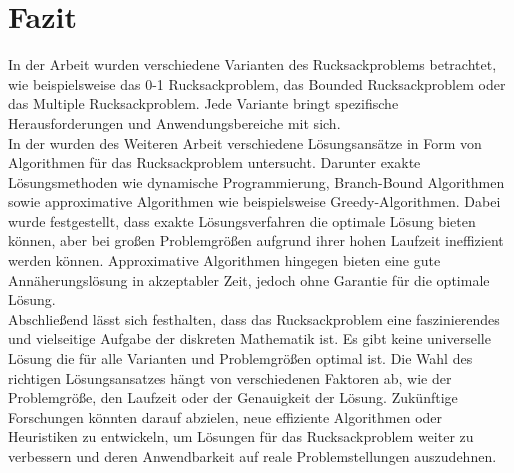 \chapter{Fazit}

In der Arbeit wurden verschiedene Varianten des Rucksackproblems betrachtet,
wie beispielsweise das 0-1 Rucksackproblem, das Bounded Rucksackproblem oder das Multiple Rucksackproblem. 
Jede Variante bringt spezifische Herausforderungen und Anwendungsbereiche mit sich.
\\
In der wurden des Weiteren Arbeit verschiedene Lösungsansätze
 in Form von Algorithmen für das Rucksackproblem untersucht.
Darunter exakte Lösungsmethoden wie dynamische Programmierung, Branch-Bound Algorithmen 
sowie approximative Algorithmen wie beispielsweise Greedy-Algorithmen. 
Dabei wurde festgestellt, dass exakte Lösungsverfahren die optimale Lösung bieten können, 
aber bei großen Problemgrößen aufgrund ihrer hohen Laufzeit ineffizient werden können. 
Approximative Algorithmen hingegen bieten eine gute Annäherungslösung in akzeptabler Zeit, 
jedoch ohne Garantie für die optimale Lösung.
\\

Abschließend lässt sich festhalten, dass das Rucksackproblem eine faszinierendes und vielseitige Aufgabe der diskreten Mathematik ist.
Es gibt keine universelle Lösung die für alle Varianten und Problemgrößen optimal ist. 
Die Wahl des richtigen Lösungsansatzes hängt von verschiedenen Faktoren ab, wie der Problemgröße, den Laufzeit oder der Genauigkeit der Lösung. 
Zukünftige Forschungen könnten darauf abzielen, neue effiziente Algorithmen oder Heuristiken zu entwickeln,
um Lösungen für das Rucksackproblem weiter zu verbessern und deren Anwendbarkeit auf reale Problemstellungen auszudehnen.